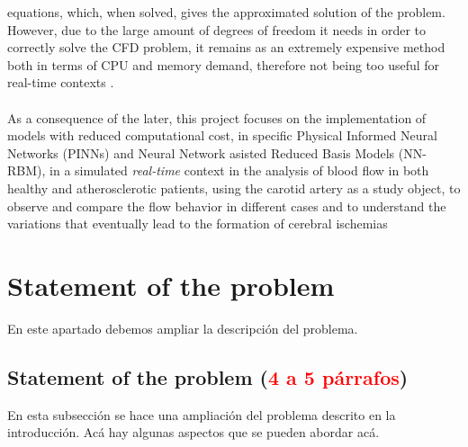 \documentclass[12pt,letterpaper]{article}
\begin{document}
equations, which, when solved, gives the approximated solution of the problem. However, due 
to the large amount of degrees of freedom it needs in order to correctly solve the CFD 
problem, it remains as an extremely expensive method both in terms of CPU and memory 
demand, therefore not being too useful for real-time contexts \cite{hesthaven2018non}.\\~\\
As a consequence of the later, this project focuses on the implementation of models with reduced computational cost, in specific Physical Informed Neural Networks (PINNs) and Neural Network asisted Reduced Basis Models (NN-RBM), in a simulated \textit{real-time} context in the analysis of blood flow in both healthy and atherosclerotic patients, using the carotid artery as a study object, to observe and compare the flow behavior in different cases and to understand the variations that eventually lead to the formation of cerebral ischemias

\section{Statement of the problem}

En este apartado debemos ampliar la descripción del problema.

\subsection{Statement of the problem (\textcolor{red}{4 a 5 párrafos})}

En esta subsección se hace una ampliación del problema descrito en la introducción. Acá hay
algunas aspectos que se pueden abordar acá.
\end{document}
